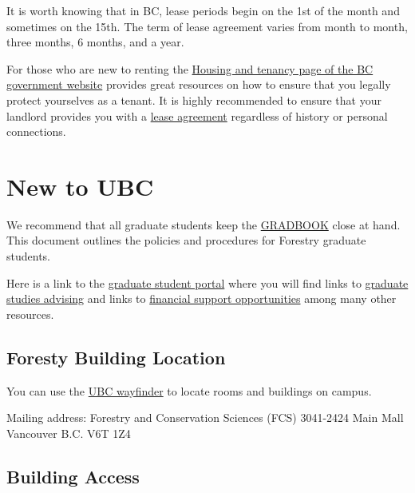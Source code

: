 \documentclass[
]{book}
\begin{document}
It is worth knowing that in BC, lease periods begin on the 1st of the month and sometimes on the 15th. The term of lease agreement varies from month to month, three months, 6 months, and a year.

For those who are new to renting the \href{https://www2.gov.bc.ca/gov/content/housing-tenancy}{Housing and tenancy page of the BC government website} provides great resources on how to ensure that you legally protect yourselves as a tenant. It is highly recommended to ensure that your landlord provides you with a \href{https://www2.gov.bc.ca/gov/content/housing-tenancy/residential-tenancies/starting-a-tenancy/tenancy-agreements}{lease agreement} regardless of history or personal connections.

\hypertarget{newtoubc}{%
\chapter*{New to UBC}\label{newtoubc}}

We recommend that all graduate students keep the \href{https://forestry.ubc.ca/files/2023/04/Forestry-Gradbook.pdf}{GRADBOOK} close at hand. This document outlines the policies and procedures for Forestry graduate students.

Here is a link to the \href{https://forestry.ubc.ca/students/graduate-student-portal/}{graduate student portal} where you will find links to \href{https://forestry.ubc.ca/students/graduate-student-portal/graduate-student-advising/}{graduate studies advising} and links to \href{https://forestry.ubc.ca/students/graduate-student-portal/financial-support/}{financial support opportunities} among many other resources.

\hypertarget{forestrybuildinglocale}{%
\section*{Foresty Building Location}\label{forestrybuildinglocale}}

You can use the \href{https://www.maps.ubc.ca/}{UBC wayfinder} to locate rooms and buildings on campus.

Mailing address:
Forestry and Conservation Sciences (FCS)
3041-2424 Main Mall
Vancouver
B.C. V6T 1Z4

\hypertarget{building-access}{%
\section{Building Access}\label{building-access}}
\end{document}
